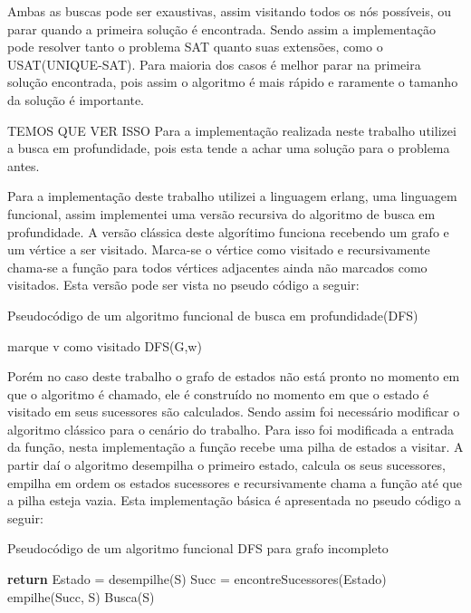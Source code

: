 \documentclass{ufsc-thesis}
\begin{document}
Ambas as buscas pode ser exaustivas, assim visitando todos os nós possíveis, ou parar quando a primeira 
solução é encontrada. Sendo assim a implementação pode resolver tanto o problema SAT quanto suas 
extensões, como o USAT(UNIQUE-SAT). Para maioria dos casos é melhor parar na primeira solução encontrada, 
pois assim o algoritmo é mais rápido e raramente o tamanho da solução é importante.

TEMOS QUE VER ISSO
Para a implementação realizada neste trabalho utilizei a busca em profundidade, pois esta tende a achar 
uma solução para o problema antes.

Para a implementação deste trabalho utilizei a linguagem erlang, uma linguagem funcional, assim implementei 
uma versão recursiva do algoritmo de busca em profundidade. A versão clássica deste algorítimo funciona 
recebendo um grafo e um vértice a ser visitado. Marca-se o vértice como visitado e recursivamente chama-se 
a função para todos vértices adjacentes ainda não marcados como visitados. Esta versão pode ser vista no
pseudo código a seguir:

\begin{algorithm}
\caption{Pseudocódigo de um algoritmo funcional de busca em profundidade(DFS)} \label{alg:dfs}
\begin{algorithmic}[1]
\State marque v como visitado
    \State DFS(G,w)
  \EndIf
\EndFor
\EndProcedure
\end{algorithmic}
\end{algorithm}

Porém no caso deste trabalho o grafo de estados não está pronto no momento em que o algoritmo é chamado,
ele é construído no momento em que o estado é visitado em seus sucessores são calculados. Sendo assim 
foi necessário modificar o algoritmo clássico para o cenário do trabalho. Para isso foi modificada a 
entrada da função, nesta implementação a função recebe uma pilha de estados a visitar. A partir daí 
o algoritmo desempilha o primeiro estado, calcula os seus sucessores, empilha em ordem os estados 
sucessores e recursivamente chama a função até que a pilha esteja vazia. Esta implementação básica 
é apresentada no pseudo código a seguir:

\begin{algorithm}
\caption{Pseudocódigo de um algoritmo funcional DFS para grafo incompleto} \label{alg:dfs-incomplete}
\begin{algorithmic}[1]
\State \textbf{return}
\Else
  \State Estado = desempilhe(S)
  \State Succ = encontreSucessores(Estado)
  \State empilhe(Succ, S)
  \State Busca(S)
\EndIf
\EndProcedure
\end{algorithmic}
\end{algorithm}
\end{document}
